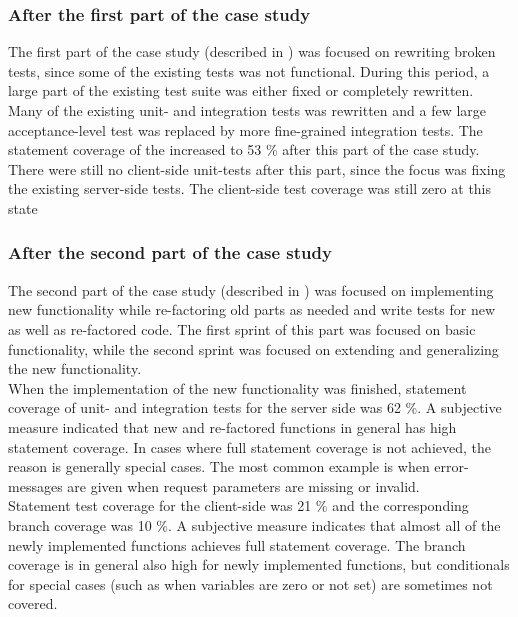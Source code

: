 \subsubsection{After the first part of the case study}

The first part of the case study (described in )
was focused on rewriting broken tests, since some of the existing tests
was not functional. During this period, a large part of the existing
test suite was either fixed or completely rewritten. Many of the
existing unit- and integration tests was rewritten and a few large
acceptance-level test was replaced by more fine-grained integration
tests. The statement coverage of the increased to 53 \% after this
part of the case study.\\

There were still no client-side unit-tests after this part, since the
focus was fixing the existing server-side tests. The client-side test
coverage was still zero at this state \\

\subsubsection{After the second part of the case study}
\label{sec:result_coverage_end}

The second part of the case study (described in )
was focused on implementing new functionality while re-factoring old
parts as needed and write tests for new as well as re-factored code. The
first sprint of this part was focused on basic functionality, while the
second sprint was focused on extending and generalizing the new
functionality.\\

When the implementation of the new functionality was finished, statement
coverage of unit- and integration tests for the server side was 62 \%. A
subjective measure indicated that new and re-factored functions in
general has high statement coverage. In cases where full statement
coverage is not achieved, the reason is generally special cases. The
most common example is when error-messages are given when request
parameters are missing or invalid.\\

Statement test coverage for the client-side was 21 \% and the
corresponding branch coverage was 10 \%. A subjective measure
indicates that almost all of the newly implemented functions achieves
full statement coverage. The branch coverage is in general also high for
newly implemented functions, but conditionals for special cases (such as
when variables are zero or not set) are sometimes not covered.\\

